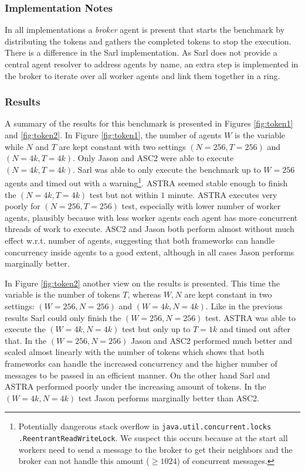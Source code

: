 \subsubsection{Implementation Notes} In all implementations a \textit{broker} agent is present that starts the benchmark by distributing the tokens and gathers the completed tokens to stop the execution. There is a difference in the Sarl implementation. As Sarl does not provide a central agent resolver to address agents by name, an extra step is implemented in the broker to iterate over all worker agents and link them together in a ring.

\subsubsection{Results} 
A summary of the results for this benchmark is presented in Figures \ref{fig:token1} and \ref{fig:token2}. In Figure \ref{fig:token1}, the number of agents $W$ is the variable while $N$ and $T$ are kept constant with two settings $(N=256,T=256)$ and $(N=4k,T=4k)$. Only Jason and ASC2 were able to execute $(N=4k,T=4k)$. Sarl was able to only execute the benchmark up to $W=256$ agents and timed out with a warning\footnote{Potentially dangerous stack overflow in \texttt{java.util.concurrent.locks} \texttt{.ReentrantReadWriteLock}. We suspect this occurs because at the start all workers need to send a message to the broker to get their neighbors and the broker can not handle this amount ($\ge1024$) of concurrent messages.}. ASTRA seemed stable enough to finish the $(N=4k,T=4k)$ test but not within $1$ minute. ASTRA executes very poorly for $(N=256,T=256)$ test, especially with lower number of worker agents, plausibly because with less worker agents each agent has more concurrent threads of work to execute. ASC2 and Jason both perform almost without much effect w.r.t. number of agents, suggesting that both frameworks can handle concurrency inside agents to a good extent, although in all cases Jason performs marginally better.

In Figure \ref{fig:token2} another view on the results is presented. This time the variable is the number of tokens $T$, whereas $W,N$ are kept constant in two settings:  $(W=256,N=256)$ and $(W=4k,N=4k)$. Like in the previous results Sarl could only finish the $(W=256,N=256)$ test. ASTRA was able to execute the $(W=4k,N=4k)$ test but only up to $T=1k$ and timed out after that. In the $(W=256,N=256)$ Jason and ASC2 performed much better and scaled almost linearly with the number of tokens which shows that both frameworks can handle the increased concurrency and the higher number of messages to be passed in an efficient manner. On the other hand Sarl and ASTRA performed poorly under the increasing amount of tokens. In the $(W=4k,N=4k)$ test Jason performs marginally better than ASC2.

